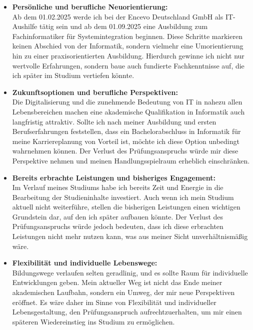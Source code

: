\documentclass[a4paper,12pt]{article}
\begin{document}
\begin{itemize}[label={-}, labelwidth=2em, left=1em]
\item \textbf{Persönliche und berufliche Neuorientierung:}\\
Ab dem 01.02.2025 werde ich bei der Encevo Deutschland GmbH als IT-Aushilfe tätig sein und ab dem 01.09.2025 eine Ausbildung zum Fachinformatiker für Systemintegration beginnen.
Diese Schritte markieren keinen Abschied von der Informatik, sondern vielmehr eine Umorientierung hin zu einer praxisorientierten Ausbildung.
Hierdurch gewinne ich nicht nur wertvolle Erfahrungen, sondern baue auch fundierte Fachkenntnisse auf, die ich später im Studium vertiefen könnte.

\break
\item \textbf{Zukunftsoptionen und berufliche Perspektiven:}\\
Die Digitalisierung und die zunehmende Bedeutung von IT in nahezu allen Lebensbereichen machen eine akademische Qualifikation in Informatik auch langfristig attraktiv.
Sollte ich nach meiner Ausbildung und ersten Berufserfahrungen feststellen, dass ein Bachelorabschluss in Informatik für meine Karriereplanung von Vorteil ist, möchte ich diese Option unbedingt wahrnehmen können.
Der Verlust des Prüfungsanspruchs würde mir diese Perspektive nehmen und meinen Handlungsspielraum erheblich einschränken.

\item \textbf{Bereits erbrachte Leistungen und bisheriges Engagement:}\\
Im Verlauf meines Studiums habe ich bereits Zeit und Energie in die Bearbeitung der Studieninhalte investiert.
Auch wenn ich mein Studium aktuell nicht weiterführe, stellen die bisherigen Leistungen einen wichtigen Grundstein dar, auf den ich später aufbauen könnte.
Der Verlust des Prüfungsanspruchs würde jedoch bedeuten, dass ich diese erbrachten Leistungen nicht mehr nutzen kann, was aus meiner Sicht unverhältnismäßig wäre.

\item \textbf{Flexibilität und individuelle Lebenswege:}\\
Bildungswege verlaufen selten geradlinig, und es sollte Raum für individuelle Entwicklungen geben.
Mein aktueller Weg ist nicht das Ende meiner akademischen Laufbahn, sondern ein Umweg, der mir neue Perspektiven eröffnet.
Es wäre daher im Sinne von Flexibilität und individueller Lebensgestaltung, den Prüfungsanspruch aufrechtzuerhalten, um mir einen späteren Wiedereinstieg ins Studium zu ermöglichen.
\\
\end{itemize}
\end{document}
